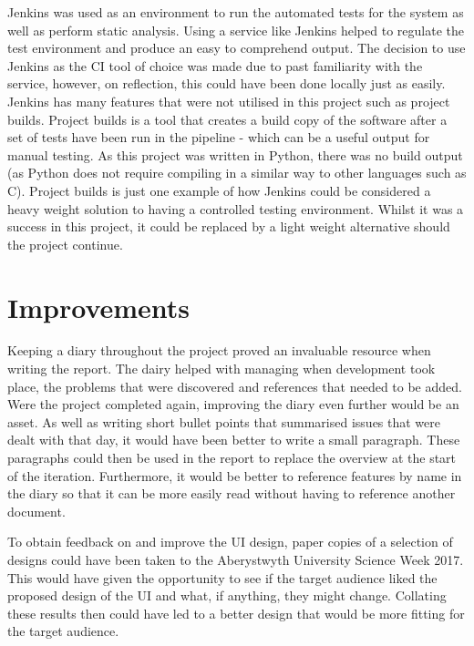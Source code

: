 Jenkins was used as an environment to run the automated tests for the system as well as perform static analysis. Using a service like Jenkins helped to regulate the test environment and produce an easy to comprehend output. The decision to use Jenkins as the CI tool of choice was made due to past familiarity with the service, however, on reflection, this could have been done locally just as easily. Jenkins has many features that were not utilised in this project such as project builds. Project builds is a tool that creates a build copy of the software after a set of tests have been run in the pipeline - which can be a useful output for manual testing. As this project was written in Python, there was no build output (as Python does not require compiling in a similar way to other languages such as C). Project builds is just one example of how Jenkins could be considered a heavy weight solution to having a controlled testing environment. Whilst it was a success in this project, it could be replaced by a light weight alternative should the project continue.

\newpage

\section{Improvements}
Keeping a diary throughout the project proved an invaluable resource when writing the report. The dairy helped with managing when development took place, the problems that were discovered and references that needed to be added. Were the project completed again, improving the diary even further would be an asset. As well as writing short bullet points that summarised issues that were dealt with that day, it would have been better to write a small paragraph. These paragraphs could then be used in the report to replace the overview at the start of the iteration. Furthermore, it would be better to reference features by name in the diary so that it can be more easily read without having to reference another document.

To obtain feedback on and improve the UI design, paper copies of a selection of designs could have been taken to the Aberystwyth University Science Week 2017. This would have given the opportunity to see if the target audience liked the proposed design of the UI and what, if anything, they might change. Collating these results then could have led to a better design that would be more fitting for the target audience.


